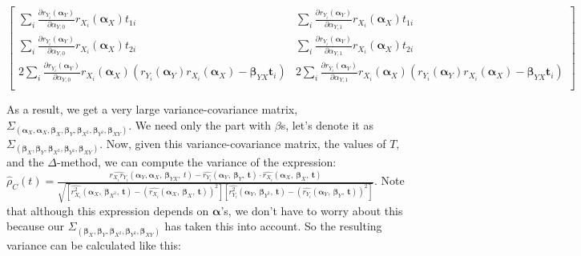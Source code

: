 \documentclass[]{article}
\begin{document}
{{\[\begin{bmatrix}
		\sum_i\frac{\partial r_{Y_i}(\pmb{\alpha}_Y)}{\partial \alpha_{Y,0}}r_{X_i}(\pmb{\alpha}_X)t_{1i} & \sum_i\frac{\partial r_{Y_i}(\pmb{\alpha}_Y)}{\partial \alpha_{Y,1}}r_{X_i}(\pmb{\alpha}_X)t_{1i}\\
		\sum_i\frac{\partial r_{Y_i}(\pmb{\alpha}_Y)}{\partial \alpha_{Y,0}}r_{X_i}(\pmb{\alpha}_X)t_{2i} & \sum_i\frac{\partial r_{Y_i}(\pmb{\alpha}_Y)}{\partial \alpha_{Y,1}}r_{X_i}(\pmb{\alpha}_X)t_{2i}\\
		2\sum_i\frac{\partial r_{Y_i}(\pmb{\alpha}_Y)}{\partial \alpha_{Y,0}}r_{X_i}(\pmb{\alpha}_X)(r_{Y_i}(\pmb{\alpha}_Y)r_{X_i}(\pmb{\alpha}_X) - \pmb{\beta}_{YX}\pmb{t}_i) & 2\sum_i\frac{\partial r_{Y_i}(\pmb{\alpha}_Y)}{\partial \alpha_{Y,1}}r_{X_i}(\pmb{\alpha}_X)(r_{Y_i}(\pmb{\alpha}_Y)r_{X_i}(\pmb{\alpha}_X) - \pmb{\beta}_{YX}\pmb{t}_i)\\
 	\end{bmatrix} 
\]
}}

As a result, we get a very large variance-covariance matrix, $\Sigma_{(\pmb{\alpha}_X, \pmb{\alpha}_X, \pmb{\beta}_{X}, \pmb{\beta}_{Y}, \pmb{\beta}_{X^2}, \pmb{\beta}_{Y^2}, \pmb{\beta}_{XY})}$. We need only the part with $\beta$s, let's denote it as $\Sigma_{(\pmb{\beta}_{X}, \pmb{\beta}_{Y}, \pmb{\beta}_{X^2}, \pmb{\beta}_{Y^2}, \pmb{\beta}_{XY})}$. Now, given this variance-covariance matrix, the values of $T$, and the $\Delta$-method, we can compute the variance of the expression: $\hat{\rho}_C(t) = \frac{  \widehat{r_{X_i}r_{Y_i}}(\pmb{\alpha}_Y, \pmb{\alpha}_X, ~\pmb{\beta}_{YX}, ~t)   -   \widehat{r_{Y_i}} (\pmb{\alpha}_Y, ~\pmb{\beta}_{Y},~\pmb{t}) \cdot \widehat{r_{X_i}} (\pmb{\alpha}_X, ~\pmb{\beta}_{X},~\pmb{t})  }{    \sqrt{   \left[ \widehat{r_{X_i}^2} (\pmb{\alpha}_X, ~\pmb{\beta}_{X^2},~\pmb{t})  - (\widehat{r_{X_i}} (\pmb{\alpha}_X, ~\pmb{\beta}_{X},~\pmb{t}))^2 \right]   \left[\widehat{r_{Y_i}^2} (\pmb{\alpha}_Y, ~\pmb{\beta}_{Y^2},~\pmb{t}) - (\widehat{r_{Y_i}} (\pmb{\alpha}_Y, ~\pmb{\beta}_{Y},~\pmb{t}))^2  \right]   }   }$. Note that although this expression depends on $\pmb{\alpha}$'s, we don't have to worry about this because our $\Sigma_{(\pmb{\beta}_{X}, \pmb{\beta}_{Y}, \pmb{\beta}_{X^2}, \pmb{\beta}_{Y^2}, \pmb{\beta}_{XY})}$ has taken this into account. So the resulting variance can be calculated like this:
\end{document}
